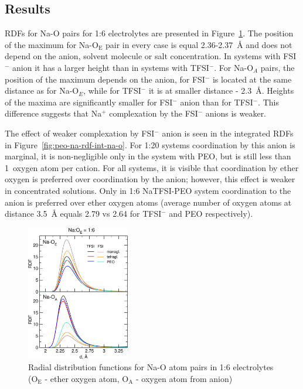 \subsection{Results}

RDFs for Na-O pairs for 1:6 electrolytes are presented in Figure~\ref{fig:peo-na-rdf-na-o}. The position of the maximum for Na-O$_{\text{E}}$ pair in every case is equal 2.36-2.37~{\AA} and does not depend on the anion, solvent molecule or salt concentration. In systems with FSI$^{-}$ anion it has a larger height than in systems with TFSI$^{-}$. For Na-O$_A$ pairs, the position of the maximum depends on the anion, for FSI$^{-}$ is located at the same distance as for Na-O$_E$, while for TFSI$^{-}$ it is at smaller distance - 2.3~{\AA}. Heights of the maxima are significantly smaller for FSI$^{-}$ anion than for TFSI$^{-}$. This difference suggests that Na$^{+}$ complexation by the FSI$^{-}$ anions is weaker.

The effect of weaker complexation by FSI$^{-}$ anion is seen in the integrated RDFs in Figure~\ref{fig:peo-na-rdf-int-na-o}. For 1:20 systems coordination by this anion is marginal, it is non-negligible only in the system with PEO, but is still less than 1~oxygen atom per cation. For all systems, it is visible that coordination by ether oxygen is preferred over coordination by the anion; however, this effect is weaker in concentrated solutions. Only in 1:6 NaTFSI-PEO system coordination to the anion is preferred over ether oxygen atoms (average number of oxygen atoms at distance 3.5~{\AA} equals 2.79 vs 2.64 for TFSI$^{-}$ and PEO respectively).

\begin{figure}[H]
    \centering
    \includegraphics[width=0.4\textwidth]{img/3-structural-data-from-md-simulations/5-peo-na/rdf-na-o-1-6.png}
    \singlespacing
    \caption{Radial distribution functions for Na-O atom pairs in 1:6 electrolytes (O$_{\text{E}}$ - ether oxygen atom, O$_{\text{A}}$ - oxygen atom from anion)}
    \label{fig:peo-na-rdf-na-o}
\end{figure}

